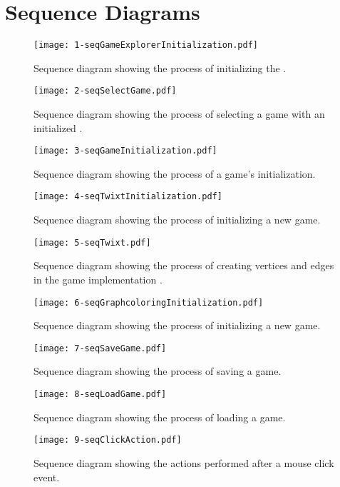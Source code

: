 \section{Sequence Diagrams}

\begin{figure}[h]
	\centering
	\texttt{[image: 1-seqGameExplorerInitialization.pdf]}
	\caption{Sequence diagram showing the process of initializing the \gameexplorer.}
	\label{img:seqGameExplorerInitialization}
\end{figure}

\begin{figure}[h]
	\centering
	\texttt{[image: 2-seqSelectGame.pdf]}
	\caption{Sequence diagram showing the process of selecting a game with an initialized \gameexplorer.}
	\label{img:seqSelectGame}
\end{figure}

\begin{figure}[h]
	\centering
	\texttt{[image: 3-seqGameInitialization.pdf]}
	\caption{Sequence diagram showing the process of a game's initialization.}
	\label{img:seqGameInitialization}
\end{figure}

\begin{figure}[h]
	\centering
	\texttt{[image: 4-seqTwixtInitialization.pdf]}
	\caption{Sequence diagram showing the process of initializing a new \twixt game.}
	\label{img:seqTwixtInitialization}
\end{figure}

\begin{figure}[h]
	\centering
	\texttt{[image: 5-seqTwixt.pdf]}
	\caption{Sequence diagram showing the process of creating vertices and edges in the game implementation \twixt.}
	\label{img:seqTwixt}
\end{figure}

\begin{figure}[h]
	\centering
	\texttt{[image: 6-seqGraphcoloringInitialization.pdf]}
	\caption{Sequence diagram showing the process of initializing a new \graphcoloring game.}
	\label{img:seqGraphcoloringInitialization}
\end{figure}

\begin{figure}[h]
	\centering
	\texttt{[image: 7-seqSaveGame.pdf]}
	\caption{Sequence diagram showing the process of saving a game.}
	\label{img:seqSaveGame}
\end{figure}

\begin{figure}[h]
	\centering
	\texttt{[image: 8-seqLoadGame.pdf]}
	\caption{Sequence diagram showing the process of loading a game.}
	\label{img:seqLoadGame}
\end{figure}

\begin{figure}[h]
	\centering
	\texttt{[image: 9-seqClickAction.pdf]}
	\caption{Sequence diagram showing the actions performed after a mouse click event.}
	\label{img:seqClickAction}
\end{figure}